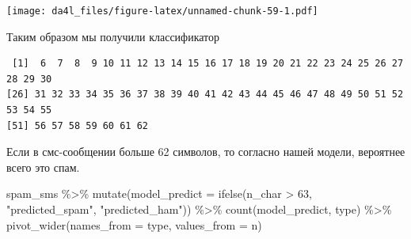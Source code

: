 \documentclass[
]{book}
\newenvironment{Shaded}{\begin{snugshade}}{\end{snugshade}}
\newcommand{\AttributeTok}[1]{\textcolor[rgb]{0.77,0.63,0.00}{#1}}
\newcommand{\DecValTok}[1]{\textcolor[rgb]{0.00,0.00,0.81}{#1}}
\newcommand{\FunctionTok}[1]{\textcolor[rgb]{0.00,0.00,0.00}{#1}}
\newcommand{\NormalTok}[1]{#1}
\newcommand{\OtherTok}[1]{\textcolor[rgb]{0.56,0.35,0.01}{#1}}
\newcommand{\SpecialCharTok}[1]{\textcolor[rgb]{0.00,0.00,0.00}{#1}}
\newcommand{\StringTok}[1]{\textcolor[rgb]{0.31,0.60,0.02}{#1}}
\begin{document}
\texttt{[image: da4l\_files/figure-latex/unnamed-chunk-59-1.pdf]}

Таким образом мы получили классификатор

\begin{Shaded}
\end{Shaded}

\begin{verbatim}
 [1]  6  7  8  9 10 11 12 13 14 15 16 17 18 19 20 21 22 23 24 25 26 27 28 29 30
[26] 31 32 33 34 35 36 37 38 39 40 41 42 43 44 45 46 47 48 49 50 51 52 53 54 55
[51] 56 57 58 59 60 61 62
\end{verbatim}

Если в смс-сообщении больше 62 символов, то согласно нашей модели, вероятнее всего это спам.

\begin{Shaded}
\begin{Highlighting}[]
\NormalTok{spam\_sms }\SpecialCharTok{\%\textgreater{}\%} 
  \FunctionTok{mutate}\NormalTok{(}\AttributeTok{model\_predict =} \FunctionTok{ifelse}\NormalTok{(n\_char }\SpecialCharTok{\textgreater{}} \DecValTok{63}\NormalTok{, }\StringTok{"predicted\_spam"}\NormalTok{, }\StringTok{"predicted\_ham"}\NormalTok{)) }\SpecialCharTok{\%\textgreater{}\%} 
  \FunctionTok{count}\NormalTok{(model\_predict, type) }\SpecialCharTok{\%\textgreater{}\%} 
  \FunctionTok{pivot\_wider}\NormalTok{(}\AttributeTok{names\_from =}\NormalTok{ type, }\AttributeTok{values\_from =}\NormalTok{ n)}
\end{Highlighting}
\end{Shaded}
\end{document}
